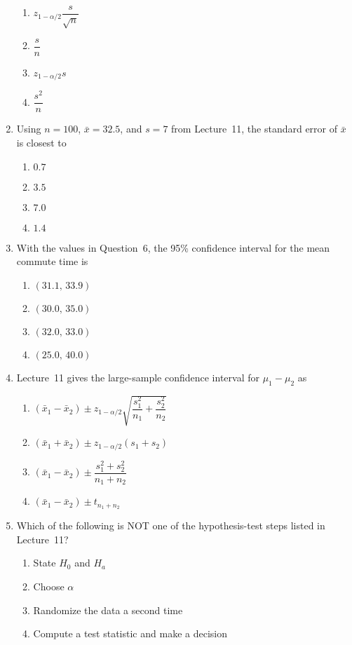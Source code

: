 \documentclass{article}
\begin{document}
\begin{enumerate}
  \begin{enumerate}[label=(\Alph*)]
  \item $z_{1-\alpha/2}\dfrac{s}{\sqrt{n}}$
  \item $\dfrac{s}{n}$
  \item $z_{1-\alpha/2}s$
  \item $\dfrac{s^2}{n}$
  \end{enumerate}
\item Using $n=100$, $\bar{x}=32.5$, and $s=7$ from Lecture~11, the standard error of $\bar{x}$ is closest to
  \begin{enumerate}[label=(\Alph*)]
  \item $0.7$
  \item $3.5$
  \item $7.0$
  \item $1.4$
  \end{enumerate}
\item With the values in Question~6, the 95\% confidence interval for the mean commute time is
  \begin{enumerate}[label=(\Alph*)]
  \item $(31.1,\,33.9)$
  \item $(30.0,\,35.0)$
  \item $(32.0,\,33.0)$
  \item $(25.0,\,40.0)$
  \end{enumerate}
\item Lecture~11 gives the large-sample confidence interval for $\mu_1-\mu_2$ as
  \begin{enumerate}[label=(\Alph*)]
  \item $(\bar{x}_1-\bar{x}_2)\pm z_{1-\alpha/2}\sqrt{\dfrac{s_1^2}{n_1}+\dfrac{s_2^2}{n_2}}$
  \item $(\bar{x}_1+\bar{x}_2)\pm z_{1-\alpha/2}(s_1+s_2)$
  \item $(\bar{x}_1-\bar{x}_2)\pm \dfrac{s_1^2+s_2^2}{n_1+n_2}$
  \item $(\bar{x}_1-\bar{x}_2)\pm t_{n_1+n_2}$
  \end{enumerate}
\item Which of the following is NOT one of the hypothesis-test steps listed in Lecture~11?
  \begin{enumerate}[label=(\Alph*)]
  \item State $H_0$ and $H_a$
  \item Choose $\alpha$
  \item Randomize the data a second time
  \item Compute a test statistic and make a decision

\end{enumerate}
\end{enumerate}
\end{document}
